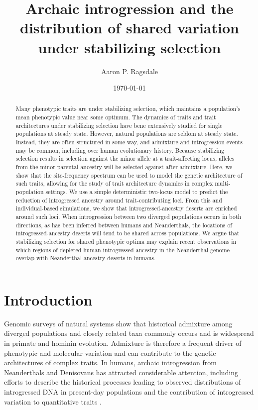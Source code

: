 \documentclass{article}
\title{Archaic introgression and the distribution
of shared variation under stabilizing selection}
\author[]{Aaron P. Ragsdale}
\affil[]{Department of Integrative Biology, University of Wisconsin--Madison, WI, USA}
\date{\today}
\begin{document}
\maketitle    


\begin{abstract}
    
    Many phenotypic traits are under stabilizing selection, which maintains a
    population's mean phenotypic value near some optimum. The dynamics of
    traits and trait architectures under stabilizing selection have bene
    extensively studied for single populations at steady state. However,
    natural populations are seldom at steady state. Instead, they are often
    structured in some way, and admixture and introgression events may be
    common, including over human evolutionary history. Because stabilizing
    selection results in selection against the minor allele at a
    trait-affecting locus, alleles from the minor parental ancestry will be
    selected against after admixture. Here, we show that the site-frequency
    spectrum can be used to model the genetic architecture of such traits,
    allowing for the study of trait architecture dynamics in complex
    multi-population settings. We use a simple deterministic two-locus model to
    predict the reduction of introgressed ancestry around trait-contributing
    loci. From this and individual-based simulations, we show that
    introgressed-ancestry deserts are enriched around such loci. When
    introgression between two diverged populations occurs in both directions,
    as has been inferred between humans and Neanderthals, the locations of
    introgressed-ancestry deserts will tend to be shared across populations. We
    argue that stabilizing selection for shared phenotypic optima may explain
    recent observations in which regions of depleted human-introgressed
    ancestry in the Neanderthal genome overlap with Neanderthal-ancestry
    deserts in humans.

\end{abstract}

\onehalfspacing

\section*{Introduction}

Genomic surveys of natural systems show that historical admixture among
diverged populations and closely related taxa commonly occurs
\citep{brandvain2014speciation, skoglund2015ancient, suvorov2022widespread} and
is widespread in primate \citep{tung2017contribution, sorensen2023genome} and
hominin \citep{wolf2018outstanding, peter2020100} evolution. Admixture is
therefore a frequent driver of phenotypic and molecular variation and can
contribute to the genetic architectures of complex traits. In humans, archaic
introgression from Neanderthals and Denisovans has attracted considerable
attention, including efforts to describe the historical processes leading to
observed distributions of introgressed DNA in present-day populations
\citep{prufer2014complete, villanea2019multiple, chen2020identifying} and the
contribution of introgressed variation to quantitative traits
\citep{sankararaman2016combined, wei2023lingering}.
\end{document}
